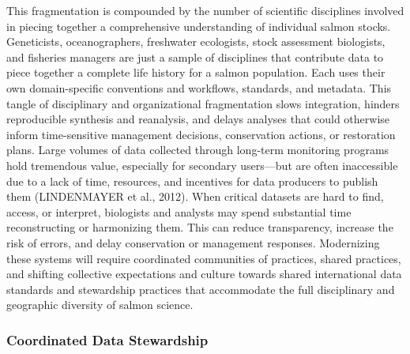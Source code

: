 \documentclass[
  letterpaper,
  DIV=11,
  numbers=noendperiod]{scrartcl}
\begin{document}
This fragmentation is compounded by the number of scientific disciplines
involved in piecing together a comprehensive understanding of individual
salmon stocks. Geneticists, oceanographers, freshwater ecologists, stock
assessment biologists, and fisheries managers are just a sample of
disciplines that contribute data to piece together a complete life
history for a salmon population. Each uses their own domain-specific
conventions and workflows, standards, and metadata. This tangle of
disciplinary and organizational fragmentation slows integration, hinders
reproducible synthesis and reanalysis, and delays analyses that could
otherwise inform time-sensitive management decisions, conservation
actions, or restoration plans. Large volumes of data collected through
long-term monitoring programs hold tremendous value, especially for
secondary users---but are often inaccessible due to a lack of time,
resources, and incentives for data producers to publish them
(LINDENMAYER et al., 2012). When critical datasets are hard to find,
access, or interpret, biologists and analysts may spend substantial time
reconstructing or harmonizing them. This can reduce transparency,
increase the risk of errors, and delay conservation or management
responses. Modernizing these systems will require coordinated
communities of practices, shared practices, and shifting collective
expectations and culture towards shared international data standards and
stewardship practices that accommodate the full disciplinary and
geographic diversity of salmon science.

\subsubsection{Coordinated Data
Stewardship}\label{coordinated-data-stewardship}
\end{document}
